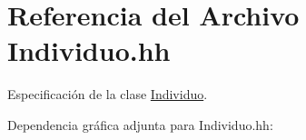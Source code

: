 \hypertarget{_individuo_8hh}{}\section{Referencia del Archivo Individuo.\+hh}
\label{_individuo_8hh}


Especificación de la clase \hyperlink{class_individuo}{Individuo}.  


Dependencia gráfica adjunta para Individuo.\+hh\+:
